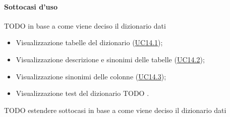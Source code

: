 \paragraph*{Sottocasi d'uso}
TODO in base a come viene deciso il dizionario dati

\begin{itemize}
  \item Visualizzazione tabelle del dizionario (\hyperref[UC14point1]{UC14.1});
  \item Visualizzazione descrizione e sinonimi delle tabelle (\hyperref[UC14point2]{UC14.2});
  \item Visualizzazione sinonimi delle colonne (\hyperref[UC14point3]{UC14.3});
  \item Visualizzazione test del dizionario TODO .
\end{itemize}


TODO estendere sottocasi in base a come viene deciso il dizionario dati
